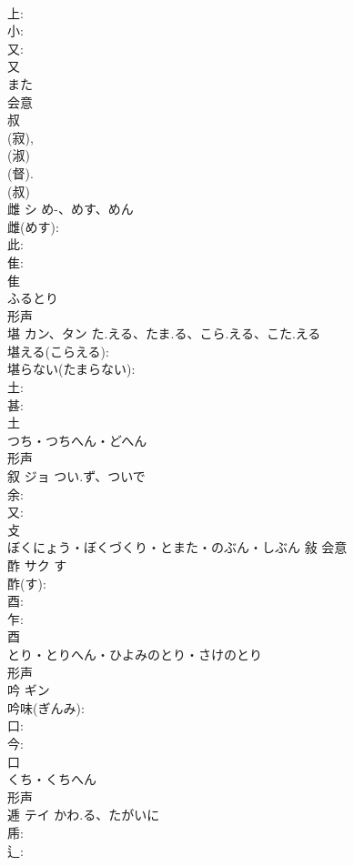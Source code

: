 \documentclass[8pt]{extreport}
\begin{document}
\begin{CJK}{UTF8}{min}
\\	上: 
\\	小: 
\\	又: 
\\	又	
\\	また	
\\	会意 
\\	叔 
\\	(寂), 
\\	(淑) 
\\	(督). 
\\	(叔) 
\\	雌	シ	め-、めす、めん		
\\	雌(めす): 
\\	此: 
\\	隹: 
\\	隹	
\\	ふるとり	
\\	形声 
\\	堪	カン、タン	た.える、たま.る、こら.える、こた.える		
\\	堪える(こらえる): 
\\	堪らない(たまらない): 
\\	土: 
\\	甚: 
\\	土	
\\	つち・つちへん・どへん	
\\	形声 
\\	叙	ジョ	つい.ず、ついで		
\\	余: 
\\	又: 
\\	攴	
\\	ぼくにょう・ぼくづくり・とまた・のぶん・しぶん	敍	会意 
\\	酢	サク	す		
\\	酢(す): 
\\	酉: 
\\	乍: 
\\	酉	
\\	とり・とりへん・ひよみのとり・さけのとり	
\\	形声 
\\	吟	ギン			
\\	吟味(ぎんみ): 
\\	口: 
\\	今: 
\\	口	
\\	くち・くちへん	
\\	形声 
\\	逓	テイ	かわ.る、たがいに		
\\	乕: 
\\	辶: 

\end{CJK}
\end{document}
